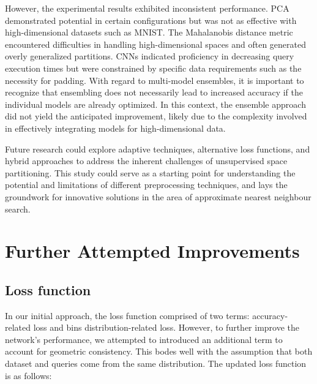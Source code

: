 \documentclass[sigconf, nonacm]{acmart}
\begin{document}
However, the experimental results exhibited inconsistent performance. PCA demonstrated potential in certain configurations but was not as effective with high-dimensional datasets such as MNIST. The Mahalanobis distance metric encountered difficulties in handling high-dimensional spaces and often generated overly generalized partitions. CNNs indicated proficiency in decreasing query execution times but were constrained by specific data requirements such as the necessity for padding. With regard to multi-model ensembles, it is important to recognize that ensembling does not necessarily lead to increased accuracy if the individual models are already optimized. In this context, the ensemble approach did not yield the anticipated improvement, likely due to the complexity involved in effectively integrating models for high-dimensional data.

Future research could explore adaptive techniques, alternative loss functions, and hybrid approaches to address the inherent challenges of unsupervised space partitioning. This study could serve as a starting point for understanding the potential and limitations of different preprocessing techniques, and lays the groundwork for innovative solutions in the area of approximate nearest neighbour search.





\appendix

\section{Further Attempted Improvements}

\subsection{Loss function}\label{sec:appendix}

In our initial approach, the loss function comprised of two terms: accuracy-related loss and bins distribution-related loss. However, to further improve the network’s performance, we attempted to introduced an additional term to account for geometric consistency\cite{geometric-con}. This bodes well with the assumption that both dataset and queries come from the same distribution. The updated loss function is as follows:
\end{document}
